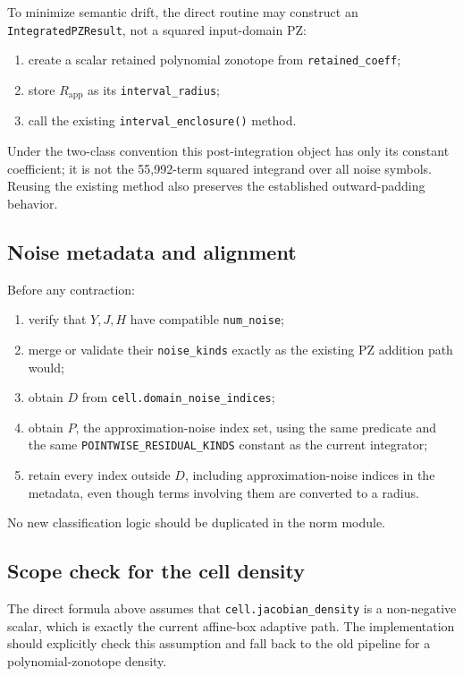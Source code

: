 \documentclass[11pt]{article}
\begin{document}
To minimize semantic drift, the direct routine may construct an
\texttt{IntegratedPZResult}, not a squared input-domain PZ:
\begin{enumerate}[label=\arabic*.]
    \item create a scalar retained polynomial zonotope from
    \texttt{retained\_coeff};
    \item store \(R_{\mathrm{app}}\) as its \texttt{interval\_radius};
    \item call the existing \texttt{interval\_enclosure()} method.
\end{enumerate}
Under the two-class convention this post-integration object has only its
constant coefficient; it is not the 55,992-term squared integrand over all
noise symbols.  Reusing the existing method also preserves the established
outward-padding behavior.

\subsection{Noise metadata and alignment}

Before any contraction:
\begin{enumerate}[label=\arabic*.]
    \item verify that \(Y,J,H\) have compatible \texttt{num\_noise};
    \item merge or validate their \texttt{noise\_kinds} exactly as the existing
    PZ addition path would;
    \item obtain \(D\) from \texttt{cell.domain\_noise\_indices};
    \item obtain \(P\), the approximation-noise index set, using the same predicate and the same
    \texttt{POINTWISE\_RESIDUAL\_KINDS} constant as the current integrator;
    \item retain every index outside \(D\), including approximation-noise indices in the
    metadata, even though terms involving them are converted to a radius.
\end{enumerate}
No new classification logic should be duplicated in the norm module.

\subsection{Scope check for the cell density}

The direct formula above assumes that
\texttt{cell.jacobian\_density} is a non-negative scalar, which is exactly the
current affine-box adaptive path.  The implementation should explicitly check
this assumption and fall back to the old pipeline for a polynomial-zonotope
density.
\end{document}
